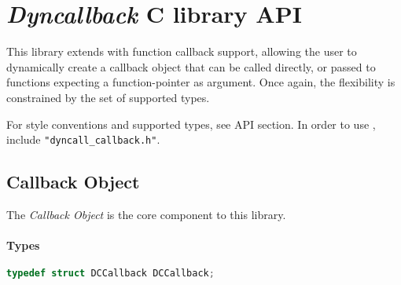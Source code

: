%
%
%
%

\newpage
\section{\emph{Dyncallback} C library API}

This library extends  with function callback support, allowing
the user to dynamically create a callback object that can be called directly,
or passed to functions expecting a function-pointer as argument.
Once again, the flexibility is constrained by the set of supported types.

For style conventions and supported types, see  API section.
In order to use , include {\tt "dyncall\_callback.h"}.

\subsection{Callback Object}

The \emph{Callback Object} is the core component to this library.

\paragraph{Types}

\begin{lstlisting}[language=c]
typedef struct DCCallback DCCallback;
\end{lstlisting}

